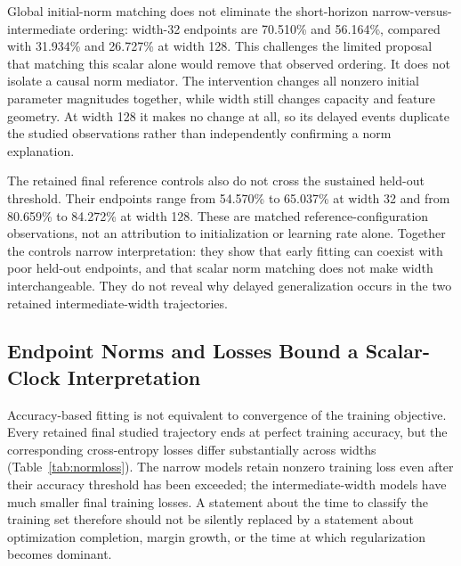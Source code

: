\documentclass{article}
\begin{document}
Global initial-norm matching does not eliminate the short-horizon narrow-versus-intermediate ordering: width-32 endpoints are 70.510\% and 56.164\%, compared with 31.934\% and 26.727\% at width 128. This challenges the limited proposal that matching this scalar alone would remove that observed ordering. It does not isolate a causal norm mediator. The intervention changes all nonzero initial parameter magnitudes together, while width still changes capacity and feature geometry. At width 128 it makes no change at all, so its delayed events duplicate the studied observations rather than independently confirming a norm explanation.

The retained final reference controls also do not cross the sustained held-out threshold. Their endpoints range from 54.570\% to 65.037\% at width 32 and from 80.659\% to 84.272\% at width 128. These are matched reference-configuration observations, not an attribution to initialization or learning rate alone. Together the controls narrow interpretation: they show that early fitting can coexist with poor held-out endpoints, and that scalar norm matching does not make width interchangeable. They do not reveal why delayed generalization occurs in the two retained intermediate-width trajectories.

\subsection{Endpoint Norms and Losses Bound a Scalar-Clock Interpretation}
Accuracy-based fitting is not equivalent to convergence of the training objective. Every retained final studied trajectory ends at perfect training accuracy, but the corresponding cross-entropy losses differ substantially across widths (Table~\ref{tab:normloss}). The narrow models retain nonzero training loss even after their accuracy threshold has been exceeded; the intermediate-width models have much smaller final training losses. A statement about the time to classify the training set therefore should not be silently replaced by a statement about optimization completion, margin growth, or the time at which regularization becomes dominant.
\end{document}
